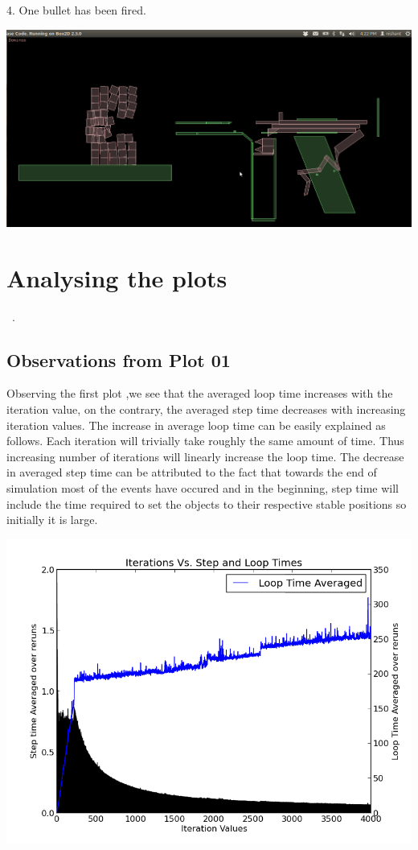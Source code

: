 \documentclass [11pt]{report}
\begin{document}
4. One bullet has been fired.\newline
\begin{center}
\includegraphics[scale=0.3]{./images/fired.png}\\

\end{center}
\section{Analysing the plots}
~\cite{mplib}.
\subsection{Observations from Plot 01}
Observing the first plot ,we see that the averaged loop time increases with the iteration value, on the contrary, the averaged step time decreases with increasing iteration values. The increase in average loop time can be easily explained as follows. Each iteration will trivially take roughly the same amount of time. Thus increasing number of iterations will linearly increase the loop time. The decrease in averaged step time can be attributed to the fact that towards the end of simulation most of the events have occured and in the beginning, step time will include the time required to set the objects to their respective stable positions so initially it is large.
\begin{center}
\includegraphics[scale=0.6]{./images/plot01.png}
\end{center}
\end{document}
